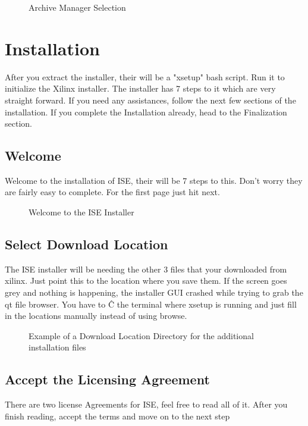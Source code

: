 \documentclass[letter]{article}
\begin{document}
\begin{figure}[!htbp]
  \centering
  \caption{Archive Manager Selection}
\end{figure}


\section{Installation}
After you extract the installer, their will be a "xsetup" bash script. Run it to initialize the Xilinx installer. The installer has 7 steps to it which are very straight forward. If you need any assistances, follow the next few sections of the installation. If you complete the Installation already, head to the Finalization section.

\subsection{Welcome}
Welcome to the installation of ISE, their will be 7 steps to this. Don't worry they are fairly easy to complete. For the first page just hit next.

\begin{figure}[!htbp]
  \centering
  \caption{Welcome to the ISE Installer}
\end{figure}

\subsection{Select Download Location}
The ISE installer will be needing the other 3 files that your downloaded from xilinx. Just point this to the location where you save them. If the screen goes grey and nothing is happening, the installer GUI crashed while trying to grab the qt file browser. You have to \^C the terminal where xsetup is running and just fill in the locations manually instead of using browse.

\begin{figure}[!htbp]
  \centering
  \caption{Example of a Download Location Directory for the additional installation files}
\end{figure}

\subsection{Accept the Licensing Agreement}
There are two license Agreements for ISE, feel free to read all of it. After you finish reading, accept the terms and move on to the next step
\end{document}
